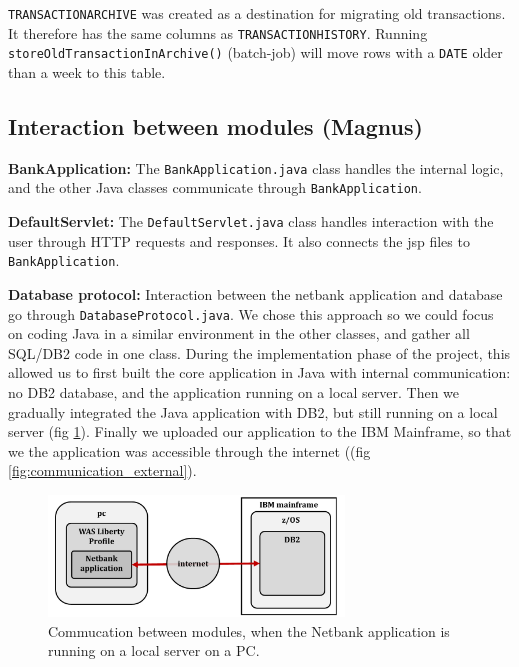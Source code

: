 \texttt{TRANSACTIONARCHIVE} was created as a destination for migrating old transactions. It therefore has the same columns as \texttt{TRANSACTIONHISTORY}. Running \texttt{storeOldTransactionInArchive()} (batch-job) will move rows with a \texttt{DATE} older than a week to this table. 





\subsection{Interaction between modules (Magnus)}

\textbf{BankApplication:} The \texttt{BankApplication.java} class handles the internal logic, and the other Java classes communicate through \texttt{BankApplication}.

\textbf{DefaultServlet:} The \texttt{DefaultServlet.java} class handles interaction with the user through HTTP requests and responses. It also connects the jsp files to \texttt{BankApplication}.

\textbf{Database protocol:} Interaction between the netbank application and database go through \texttt{DatabaseProtocol.java}. We chose this approach so we could focus on coding Java in a similar environment in the other classes, and gather all SQL/DB2 code in one class. During the implementation phase of the project, this allowed us to first built the core application in Java with internal communication: no DB2 database, and the application running on a local server. Then we gradually integrated the Java application with DB2, but still running on a local server (fig \ref{fig:communication_local}). Finally we uploaded our application to the IBM Mainframe, so that we the application was accessible through the internet ((fig \ref{fig:communication_external}).

\begin{figure}[H]
\centering
\includegraphics[width = 0.7\textwidth]{figures/communication2.pdf}
\caption{Commucation between modules, when the Netbank application is running on a local server on a PC.}\label{fig:communication_local}
\end{figure}




